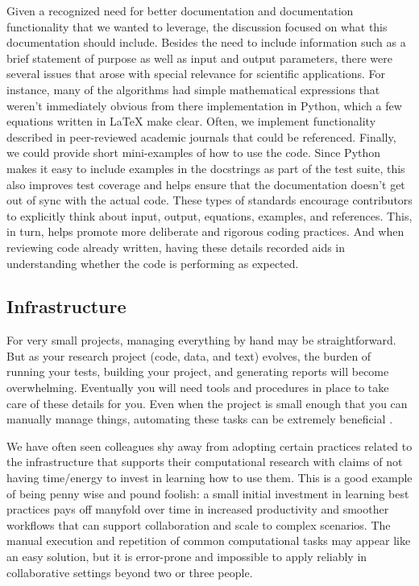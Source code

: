 \documentclass[ChapterTOCs,krantz2]{krantz} %
\begin{document}
Given a recognized need for better documentation and documentation
functionality that we wanted to leverage, the discussion focused on what this
documentation should include. Besides the need to include information such as
a brief statement of purpose as well as input and output parameters, there
were several issues that arose with special relevance for scientific
applications.  For instance, many of the algorithms had simple mathematical
expressions that weren't immediately obvious from there implementation in
Python, which a few equations written in \LaTeX{} make clear.  Often, we
implement functionality described in peer-reviewed academic journals
that could be referenced. Finally, we could provide short mini-examples of how
to use the code. Since Python makes it easy to include examples in the
docstrings as part of the test suite, this also improves test coverage and
helps ensure that the documentation doesn't get out of sync with the actual
code. These types of standards encourage contributors to  explicitly think
about input, output, equations, examples, and references. This, in turn, helps
promote more deliberate and rigorous coding practices. And when reviewing code
already written, having these details recorded aids in understanding whether
the code is performing as expected.

\subsection{Infrastructure}

For very small projects, managing everything by hand may be straightforward.
But as your research project (code, data, and text) evolves, the burden of
running your tests, building your project, and generating reports will become
overwhelming. Eventually you will need tools and procedures in place to take
care of these details for you. Even when the project is small enough that you
can manually manage things, automating these tasks can be extremely beneficial
\cite{doar2005practical}.

We have often seen colleagues shy away from adopting certain practices related
to the infrastructure that supports their computational research with claims of
not having time/energy to invest in learning how to use them.  This is a good
example of being penny wise and pound foolish: a small initial investment in
learning best practices pays off manyfold over time in increased productivity
and smoother workflows that can support collaboration and scale to complex
scenarios.  The manual execution and repetition of common computational tasks
may appear like an easy solution, but it is error-prone and impossible to apply
reliably in collaborative settings beyond two or three people.
\end{document}
